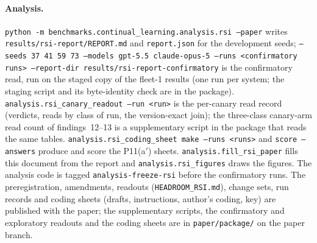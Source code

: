 \documentclass[11pt]{article}
\newcommand{\code}[1]{\texttt{#1}}
\begin{document}
\paragraph{Analysis.} \code{python -m benchmarks.continual\_learning.analysis.rsi --paper}
writes \code{results/rsi-report/REPORT.md} and \code{report.json} for the development seeds;
\code{--seeds 37 41 59 73 --models gpt-5.5 claude-opus-5 --runs <confirmatory runs>
--report-dir results/rsi-report-confirmatory} is the confirmatory read, run on the staged copy
of the fleet-1 results (one run per system; the staging script and its byte-identity check are
in the package). \code{analysis.rsi\_canary\_readout --run <run>} is the per-canary read record
(verdicts, reads by class of run, the version-exact join); the three-class canary-arm read count
of findings~12--13 is a supplementary script in the package that reads the same tables.
\code{analysis.rsi\_coding\_sheet make --runs <runs>} and \code{score --answers} produce and
score the P11(a$'$) sheets. \code{analysis.fill\_rsi\_paper} fills this document from the
report and \code{analysis.rsi\_figures} draws the figures. The analysis code is tagged
\code{analysis-freeze-rsi} before the confirmatory runs. The preregistration, amendments,
readouts (\code{HEADROOM\_RSI.md}), change sets, run records and coding sheets (drafts,
instructions, author's coding, key) are published with the paper; the supplementary scripts,
the confirmatory and exploratory readouts and the coding sheets are in \code{paper/package/} on
the paper branch.
\end{document}
